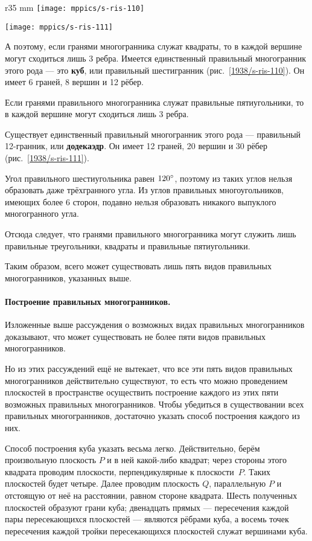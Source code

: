 \begin{wrapfigure}{r}{35 mm}
\vskip-0mm
\centering
\texttt{[image: mppics/s-ris-110]}
\caption{}\label{1938/s-ris-110}
\bigskip
\texttt{[image: mppics/s-ris-111]}
\caption{}\label{1938/s-ris-111}
\vskip-0mm
\end{wrapfigure}

А поэтому, если гранями многогранника служат квадраты, то в каждой вершине могут сходиться лишь 3 ребра.
Имеется единственный правильный многогранник этого рода — это \textbf{куб}, или правильный шестигранник (рис.~\ref{1938/s-ris-110}).
Он имеет 6 граней, 8 вершин и 12 рёбер.

Если гранями правильного многогранника служат правильные пятиугольники, то в каждой вершине могут сходиться лишь 3 ребра.

Существует единственный правильный многогранник этого рода — правильный 12-гранник, или \textbf{додекаэдр}.
Он имеет 12 граней, 20 вершин и 30 рёбер (рис.~\ref{1938/s-ris-111}).

Угол правильного шестиугольника равен $120\degree$, поэтому из таких углов нельзя образовать даже трёхгранного угла.
Из углов правильных многоугольников, имеющих более 6 сторон, подавно нельзя образовать никакого выпуклого многогранного угла.

Отсюда следует, что гранями правильного многогранника могут служить лишь правильные треугольники, квадраты и правильные пятиугольники.

Таким образом, всего может существовать лишь пять видов правильных многогранников, указанных выше.

\paragraph{Построение правильных многогранников.}\label{1938/s98}
Изложенные выше рассуждения о возможных видах правильных многогранников доказывают, что может существовать не более пяти видов правильных многогранников.

Но из этих рассуждений ещё не вытекает, что все эти пять видов правильных многогранников действительно существуют, то есть что можно проведением плоскостей в пространстве осуществить построение каждого из этих пяти возможных правильных многогранников.
Чтобы убедиться в существовании всех правильных многогранников, достаточно указать способ построения каждого из них.

Способ построения куба указать весьма легко.
Действительно, берём произвольную плоскость $P$ и в ней какой-либо квадрат;
через стороны этого квадрата проводим плоскости, перпендикулярные к плоскости~$P$.
Таких плоскостей будет четыре.
Далее проводим плоскость $Q$, параллельную $P$ и отстоящую от неё на расстоянии, равном стороне квадрата.
Шесть полученных плоскостей образуют грани куба;
двенадцать прямых — пересечения каждой пары пересекающихся плоскостей — являются рёбрами куба, а восемь точек пересечения каждой тройки пересекающихся плоскостей служат вершинами куба.


